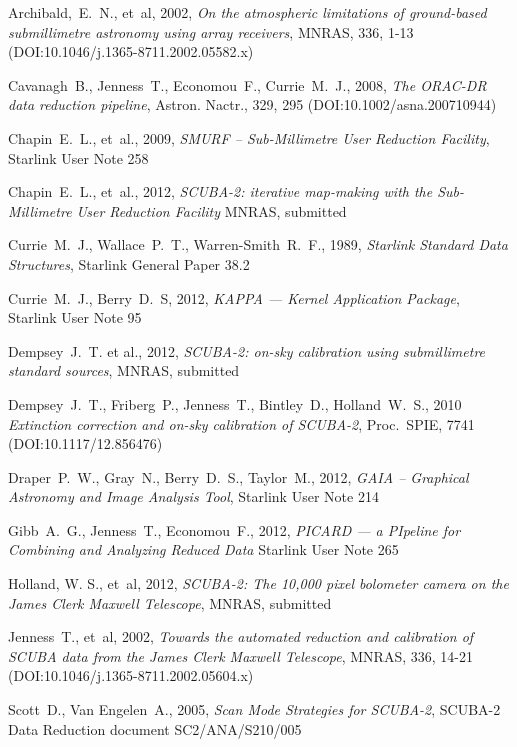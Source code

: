 \documentclass[twoside,11pt]{article}
\newcommand{\htmladdnormallink}[2]{#1}
\newcommand{\xref}[3]{#1}
\renewcommand{\_}{\texttt{\symbol{95}}}
\begin{document}
\begin{thebibliography}{}

Archibald,~E.~N., et~al, 2002, \htmladdnormallink{\textit{On the atmospheric limitations
of ground-based submillimetre astronomy using array receivers}}{
http://dx.doi.org/10.1046/j.1365-8711.2002.05582.x}, MNRAS, 336, 1-13
(DOI:10.1046/j.1365-8711.2002.05582.x)

Cavanagh~B., Jenness~T., Economou~F., Currie~M.~J., 2008,
\htmladdnormallink{\textit{The ORAC-DR data reduction
pipeline}}{http://dx.doi.org/10.1002/asna.200710944}, Astron. Nactr., 329, 295
(DOI:10.1002/asna.200710944)

Chapin~E.~L., et~al., 2009, \textit{SMURF -- Sub-Millimetre User Reduction
Facility}, \xref{Starlink User Note 258}{sun258}{}

Chapin~E.~L., et~al., 2012, \textit{SCUBA-2: iterative map-making with the
Sub-Millimetre User Reduction Facility} MNRAS, submitted

Currie~M.~J., Wallace~P.~T., Warren-Smith~R.~F., 1989,
\textit{Starlink Standard Data Structures}, \xref{Starlink General
Paper 38.2}{sgp38}{}

Currie~M.~J., Berry~D.~S, 2012, \textit{KAPPA --- Kernel Application Package},
\xref{Starlink User Note 95}{sun95}{}

Dempsey~J.~T. et al., 2012, \textit{SCUBA-2: on-sky calibration using
submillimetre standard sources}, MNRAS, submitted

Dempsey~J.~T., Friberg~P., Jenness~T., Bintley~D., Holland~W.~S., 2010
\htmladdnormallink{\textit{Extinction correction and on-sky calibration of
SCUBA-2}}{http://dx.doi.org/10.1117/12.856476},
Proc.\ SPIE, 7741 (DOI:10.1117/12.856476)

Draper~P.~W., Gray~N., Berry~D.~S., Taylor~M., 2012,
\textit{GAIA -- Graphical Astronomy and Image Analysis Tool},
\xref{Starlink User Note 214}{sun214}{}

Gibb~A.~G., Jenness~T., Economou~F., 2012, \textit{PICARD --- a
PIpeline for Combining and Analyzing Reduced Data}
\xref{Starlink User Note 265}{sun265}{}

Holland, W. S., et~al, 2012, \textit{SCUBA-2: The 10,000 pixel bolometer
camera on the James Clerk Maxwell Telescope}, MNRAS, submitted

Jenness~T., et~al, 2002, \htmladdnormallink{\textit{Towards the automated
reduction and calibration of SCUBA data from the James Clerk Maxwell
Telescope}}{http://dx.doi.org/10.1046/j.1365-8711.2002.05604.x},
MNRAS, 336, 14-21 (DOI:10.1046/j.1365-8711.2002.05604.x)

Scott~D., Van Engelen~A., 2005, \htmladdnormallink{\textit{Scan Mode Strategies for
  SCUBA-2}}{http://docs.jach.hawaii.edu/JCMT/SC2/ANA/S210/005/sc2_ana_s210_005.ps},
  SCUBA-2 Data Reduction document SC2/ANA/S210/005

\end{thebibliography}
\end{document}
